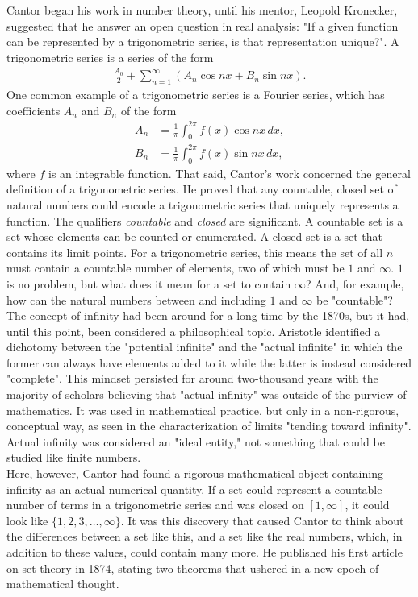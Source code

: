Cantor began his work in number theory, until his mentor, Leopold Kronecker, suggested that he answer an open question in real analysis: "If a given function can be represented by a trigonometric series, is that representation unique?". A trigonometric series is a series of the form
\begin{align*}
\frac{A_0}{2}+\sum_{n=1}^{\infty}(A_n\cos nx + B_n\sin nx).
\end{align*}
One common example of a trigonometric series is a Fourier series, which has coefficients $A_n$ and $B_n$ of the form
\begin{align*}
A_n&=\frac{1}{\pi}\int_{0}^{2\pi}f(x)\cos nx\,dx, \\[1mm]
B_n&=\frac{1}{\pi}\int_{0}^{2\pi}f(x)\sin nx\,dx,
\end{align*}
where $f$ is an integrable function. That said, Cantor's work concerned the general definition of a trigonometric series. He proved that any countable, closed set of natural numbers could encode a trigonometric series that uniquely represents a function. The qualifiers \textit{countable} and \textit{closed} are significant. A countable set is a set whose elements can be counted or enumerated. A closed set is a set that contains its limit points. For a trigonometric series, this means the set of all $n$ must contain a countable number of elements, two of which must be $1$ and $\infty$. $1$ is no problem, but what does it mean for a set to contain $\infty$? And, for example, how can the natural numbers between and including $1$ and $\infty$ be "countable"? \\

The concept of infinity had been around for a long time by the 1870s, but it had, until this point, been considered a philosophical topic. Aristotle identified a dichotomy between the "potential infinite" and the "actual infinite" in which the former can always have elements added to it while the latter is instead considered "complete". This mindset persisted for around two-thousand years with the majority of scholars believing that "actual infinity" was outside of the purview of mathematics. It was used in mathematical practice, but only in a non-rigorous, conceptual way, as seen in the characterization of limits "tending toward infinity". Actual infinity was considered an "ideal entity," not something that could be studied like finite numbers. \\

Here, however, Cantor had found a rigorous mathematical object containing infinity as an actual numerical quantity. If a set could represent a countable number of terms in a trigonometric series and was closed on $[1,\infty]$, it could look like $\{1,2,3,\dots,\infty\}$. It was this discovery that caused Cantor to think about the differences between a set like this, and a set like the real numbers, which, in addition to these values, could contain many more. He published his first article on set theory in 1874, stating two theorems that ushered in a new epoch of mathematical thought. \\

